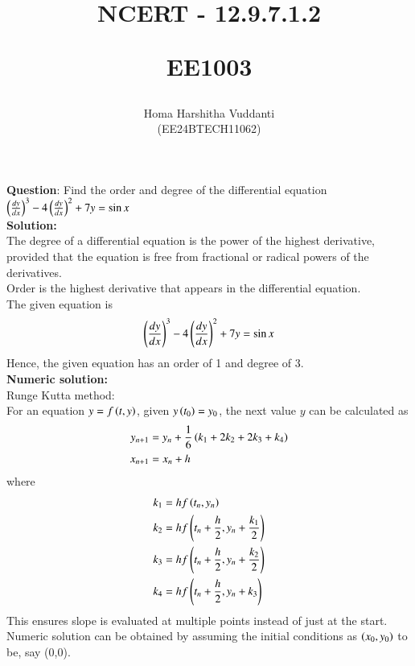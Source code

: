 \documentclass[journal]{IEEEtran}
\begin{document}


\title{
NCERT - 12.9.7.1.2

\large{EE1003}
}
\author{Homa Harshitha Vuddanti

(EE24BTECH11062)
}	

\maketitle

\bigskip

\renewcommand{\thefigure}{\theenumi}
\renewcommand{\thetable}{\theenumi}
\textbf{Question}: Find the order and degree of the differential equation $\left(\frac{dy}{dx}\right)^3-4\left(\frac{dy}{dx}\right)^2+7y=\sin x$\\
\textbf{Solution:} \\
The degree of a differential equation is the power of the highest derivative, provided that the equation is free from fractional or radical powers of the derivatives.\\
Order is the highest derivative that appears in the differential equation.\\
The given equation is 
\begin{align}
\left(\frac{dy}{dx}\right)^3-4\left(\frac{dy}{dx}\right)^2+7y=\sin x \label{eq:1}
\end{align}
Hence, the given equation has an order of 1 and degree of 3.\\
\textbf{Numeric solution:}\\
Runge Kutta method:\\
For an equation $y=f\left(t,y\right)$, given $y\left(t_0\right)=y_0$, the next value $y$ can be calculated as
\begin{align}
y_{n+1}&=y_n+\frac{1}{6}\left(k_1+2k_2+2k_3+k_4\right)\\
x_{n+1}&=x_n+h
\end{align}
where
\begin{align}
k_1&=hf\left(t_n,y_n\right)\\
k_2&=hf\left(t_n+\frac{h}{2},y_n+\frac{k_1}{2}\right)\\
k_3&=hf\left(t_n+\frac{h}{2},y_n+\frac{k_2}{2}\right)\\
k_4&=hf\left(t_n+\frac{h}{2},y_n+k_3\right)
\end{align}
This ensures slope is evaluated at multiple points instead of just at the start. \\
Numeric solution can be obtained by assuming the initial conditions as $\left(x_0,y_0\right)$ to be, say (0,0).\\
\end{document}

